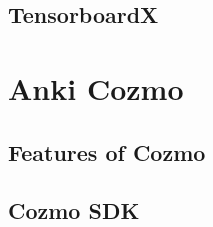 \lipsum[10]

\subsection{TensorboardX}

\lipsum[10]

\section{Anki Cozmo}

\lipsum[10]

\subsection{Features of Cozmo}

\lipsum[10]

\subsection{Cozmo SDK}

\lipsum[10]

